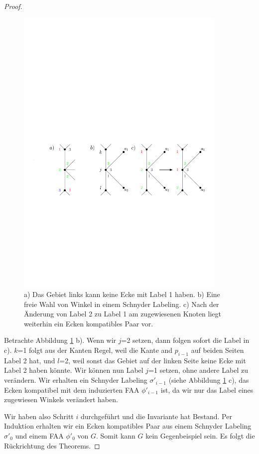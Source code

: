 \begin{proof}
\begin{figure}[b!]
	\centering
	  \includegraphics[width=0.9\textwidth]{lem6_5.pdf}
    	\caption{a) Das Gebiet links kann keine Ecke mit Label 1 haben. b) Eine freie Wahl von Winkel in einem Schnyder Labeling. c) Nach der Änderung von Label 2 zu Label 1 am zugewiesenen Knoten liegt weiterhin ein Ecken kompatibles Paar vor.}
    	\label{pic_lem6_5}
\end{figure}

Betrachte Abbildung \ref{pic_lem6_5} b). Wenn wir $j$=2 setzen, dann folgen sofort die Label in c). $k$=1 folgt aus der Kanten Regel, weil die Kante and $p_{i-1}$ auf beiden Seiten Label 2 hat, und $l$=2, weil sonst das Gebiet auf der linken Seite keine Ecke mit Label 2 haben könnte. Wir können nun Label $j$=1 setzen, ohne andere Label zu verändern. Wir erhalten ein Schnyder Labeling $\sigma'_{i-1}$ (siehe Abbildung \ref{pic_lem6_5} c), das Ecken kompatibel mit dem induzierten FAA $\phi'_{i-1}$ ist, da wir nur das Label eines zugewiesen Winkels verändert haben.

Wir haben also Schritt $i$ durchgeführt und die Invariante hat Bestand. Per Induktion erhalten wir ein Ecken kompatibles Paar aus einem Schnyder Labeling $\sigma'_0$ und einem FAA $\phi'_0$ von $G$. Somit kann $G$ kein Gegenbeispiel sein. Es folgt die Rückrichtung des Theorems.
\end{proof}

